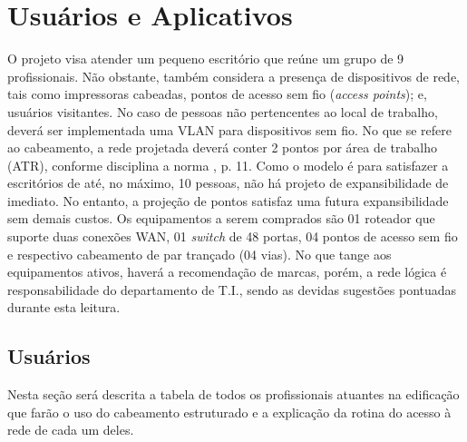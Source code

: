 \documentclass[	DIV=calc,%
							paper=a4,%
							fontsize=12pt,%
							onecolumn]{scrartcl}	 					%
\begin{document}
\section{Usuários e Aplicativos}
O projeto visa atender um pequeno escritório que reúne um grupo de 9 profissionais. Não obstante, também considera a presença de dispositivos de rede, tais como impressoras cabeadas, pontos de acesso sem fio (\textit{access points}); e, usuários visitantes. No caso de pessoas não pertencentes ao local de trabalho, deverá ser implementada uma VLAN para dispositivos sem fio. No que se refere ao cabeamento, a rede projetada deverá conter 2 pontos por área de trabalho (ATR), conforme disciplina a norma \cite{abnt14565}, p. 11. Como o modelo é para satisfazer a escritórios de até, no máximo, 10 pessoas, não há projeto de expansibilidade de imediato. No entanto, a projeção de pontos satisfaz uma futura expansibilidade sem demais custos. Os equipamentos a serem comprados são 01 roteador que suporte duas conexões WAN, 01 \textit{switch} de 48 portas, 04 pontos de acesso sem fio e respectivo cabeamento de par trançado (04 vias). No que tange aos equipamentos ativos, haverá a recomendação de marcas, porém, a rede lógica é responsabilidade do departamento de T.I., sendo as devidas sugestões pontuadas durante esta leitura.

\subsection{Usuários}

Nesta seção será descrita a tabela de todos os profissionais atuantes na edificação que farão o uso do cabeamento estruturado e a explicação da rotina do acesso à rede de cada um deles.




\end{document}
